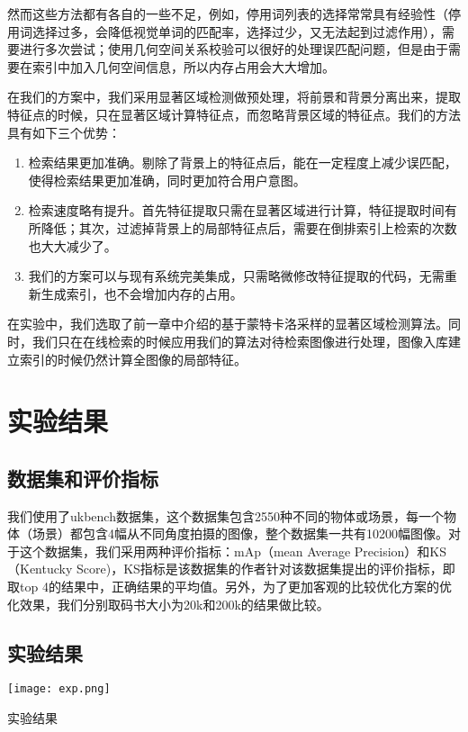 然而这些方法都有各自的一些不足，例如，停用词列表的选择常常具有经验性（停用词选择过多，会降低视觉单词的匹配率，选择过少，又无法起到过滤作用），需要进行多次尝试；使用几何空间关系校验可以很好的处理误匹配问题，但是由于需要在索引中加入几何空间信息，所以内存占用会大大增加。

在我们的方案中，我们采用显著区域检测做预处理，将前景和背景分离出来，提取特征点的时候，只在显著区域计算特征点，而忽略背景区域的特征点。我们的方法具有如下三个优势：
\begin{enumerate}
\item 检索结果更加准确。剔除了背景上的特征点后，能在一定程度上减少误匹配，使得检索结果更加准确，同时更加符合用户意图。
\item 检索速度略有提升。首先特征提取只需在显著区域进行计算，特征提取时间有所降低；其次，过滤掉背景上的局部特征点后，需要在倒排索引上检索的次数也大大减少了。
\item 我们的方案可以与现有系统完美集成，只需略微修改特征提取的代码，无需重新生成索引，也不会增加内存的占用。
\end{enumerate}

在实验中，我们选取了前一章中介绍的基于蒙特卡洛采样的显著区域检测算法。同时，我们只在在线检索的时候应用我们的算法对待检索图像进行处理，图像入库建立索引的时候仍然计算全图像的局部特征。

\section{实验结果}
\subsection{数据集和评价指标}
我们使用了ukbench数据集\cite{nister2006scalable}，这个数据集包含2550种不同的物体或场景，每一个物体（场景）都包含4幅从不同角度拍摄的图像，整个数据集一共有10200幅图像。对于这个数据集，我们采用两种评价指标：mAp（mean Average Precision）和KS（Kentucky Score)，KS指标是该数据集的作者针对该数据集提出的评价指标，即取top 4的结果中，正确结果的平均值。另外，为了更加客观的比较优化方案的优化效果，我们分别取码书大小为20k和200k的结果做比较。

\subsection{实验结果}
\begin{table}[h]
\centering
\texttt{[image: exp.png]}
\caption{实验结果}\label{tab:sal_res}
\end{table}

